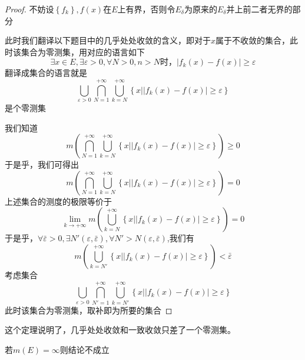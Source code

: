 \documentclass[lang=cn,14pt]{elegantbook}
\begin{document}
	\begin{proof}
		不妨设$\left\{ f_k \right\} ,f\left( x \right)$在$E$上有界，否则令$ E_{\delta}$为原来的$ E_{\delta}$并上前二者无界的部分
		
		此时我们翻译以下题目中的几乎处处收敛的含义，即对于$x$属于不收敛的集合，此时该集合为零测集，用对应的语言如下
		\begin{equation*}
			\exists x\in E,\exists \varepsilon >0,\forall N>0,n>N\text{时，}|f_k\left( x \right) -f\left( x \right) |\ge \varepsilon 
		\end{equation*}
		翻译成集合的语言就是
		\begin{equation*}
			\bigcup_{\varepsilon >0}{\bigcap_{N=1}^{+\infty}{\bigcup_{k=N}^{+\infty}{\left\{ x||f_k\left( x \right) -f\left( x \right) |\ge \varepsilon \right\}}}}
		\end{equation*}
		是个零测集
		
		我们知道
		\begin{equation*}
			m(\bigcap_{N=1}^{+\infty}{\bigcup_{k=N}^{+\infty}{\left\{ x||f_k\left( x \right) -f\left( x \right) |\ge \varepsilon \right\}}})\ge 0
		\end{equation*}
		于是乎，我们可得出
		\begin{equation*}
			m(\bigcap_{N=1}^{+\infty}{\bigcup_{k=N}^{+\infty}{\left\{ x||f_k\left( x \right) -f\left( x \right) |\ge \varepsilon \right\}}})= 0
		\end{equation*}
		上述集合的测度的极限等价于
		\begin{equation*}
			\lim_{k\rightarrow +\infty} m\left( \bigcup_{k=N}^{+\infty}{\left\{ x||f_k\left( x \right) -f\left( x \right) |\ge \varepsilon \right\}} \right) =0
		\end{equation*}
		于是乎，$\forall \bar{\varepsilon}>0,\exists N'(\varepsilon,\bar{\varepsilon}),\forall N'>N(\varepsilon,\bar{\varepsilon})$,我们有
		\begin{equation*}
			m\left( \bigcup_{k=N'}^{+\infty}{\left\{ x||f_k\left( x \right) -f\left( x \right) |\ge \varepsilon \right\}} \right)<\bar{\varepsilon}
		\end{equation*}
		考虑集合
		\begin{equation*}
			\bigcup_{\varepsilon>0}{\bigcap_{N'=1}^{+\infty}{\bigcup_{k=N'}^{+\infty}{\left\{ x||f_k\left( x \right) -f\left( x \right) |\ge\varepsilon \right\}}}}
		\end{equation*}
		此时该集合为零测集，取补即为所要的集合
	\end{proof}
	\begin{remark}
		这个定理说明了，几乎处处收敛和一致收敛只差了一个零测集。
	\end{remark}
	\begin{remark}
		若$m(E)=\infty$则结论不成立
	\end{remark}
\end{document}
